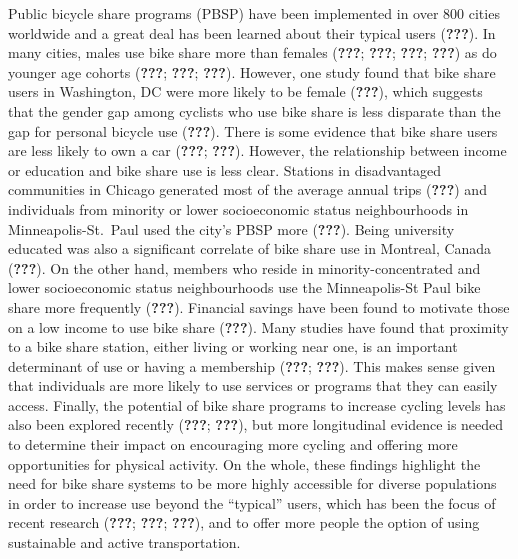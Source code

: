 \documentclass[]{elsarticle} %
\begin{document}
Public bicycle share programs (PBSP) have been implemented in over 800
cities worldwide and a great deal has been learned about their typical
users ({\textbf{???}}). In many cities, males use bike share more than
females ({\textbf{???}}; {\textbf{???}}; {\textbf{???}}; {\textbf{???}})
as do younger age cohorts ({\textbf{???}}; {\textbf{???}};
{\textbf{???}}). However, one study found that bike share users in
Washington, DC were more likely to be female ({\textbf{???}}), which
suggests that the gender gap among cyclists who use bike share is less
disparate than the gap for personal bicycle use ({\textbf{???}}). There
is some evidence that bike share users are less likely to own a car
({\textbf{???}}; {\textbf{???}}). However, the relationship between
income or education and bike share use is less clear. Stations in
disadvantaged communities in Chicago generated most of the average
annual trips ({\textbf{???}}) and individuals from minority or lower
socioeconomic status neighbourhoods in Minneapolis-St.~Paul used the
city's PBSP more ({\textbf{???}}). Being university educated was also a
significant correlate of bike share use in Montreal, Canada
({\textbf{???}}). On the other hand, members who reside in
minority-concentrated and lower socioeconomic status neighbourhoods use
the Minneapolis-St Paul bike share more frequently ({\textbf{???}}).
Financial savings have been found to motivate those on a low income to
use bike share ({\textbf{???}}). Many studies have found that proximity
to a bike share station, either living or working near one, is an
important determinant of use or having a membership ({\textbf{???}};
{\textbf{???}}). This makes sense given that individuals are more likely
to use services or programs that they can easily access. Finally, the
potential of bike share programs to increase cycling levels has also
been explored recently ({\textbf{???}}; {\textbf{???}}), but more
longitudinal evidence is needed to determine their impact on encouraging
more cycling and offering more opportunities for physical activity. On
the whole, these findings highlight the need for bike share systems to
be more highly accessible for diverse populations in order to increase
use beyond the ``typical'' users, which has been the focus of recent
research ({\textbf{???}}; {\textbf{???}}; {\textbf{???}}), and to offer
more people the option of using sustainable and active transportation.
\end{document}
